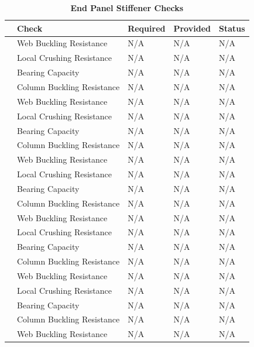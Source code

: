 \documentclass[12pt,a4paper]{report}
\numberwithin{table}{chapter}
\numberwithin{figure}{chapter}
\begin{document}
\begin{longtable}{|C{2.5cm}|L{3.5cm}|C{3.5cm}|>{\centering\arraybackslash}p{4.2cm}|C{1.8cm}|}
\caption{\textbf{End Panel Stiffener Checks}}
\hline
\textbf{} & \textbf{Check} & \textbf{Required} & \textbf{Provided} & \textbf{Status} \\[6pt]
\hline
{} & Web Buckling Resistance & N/A & N/A & N/A \\[6pt]
 & Local Crushing Resistance & N/A & N/A & N/A \\[6pt]
 & Bearing Capacity & N/A & N/A & N/A \\[6pt]
 & Column Buckling Resistance & N/A & N/A & N/A \\[6pt]
\hline
{} & Web Buckling Resistance & N/A & N/A & N/A \\[6pt]
 & Local Crushing Resistance & N/A & N/A & N/A \\[6pt]
 & Bearing Capacity & N/A & N/A & N/A \\[6pt]
 & Column Buckling Resistance & N/A & N/A & N/A \\[6pt]
\hline
{} & Web Buckling Resistance & N/A & N/A & N/A \\[6pt]
 & Local Crushing Resistance & N/A & N/A & N/A \\[6pt]
 & Bearing Capacity & N/A & N/A & N/A \\[6pt]
 & Column Buckling Resistance & N/A & N/A & N/A \\[6pt]
\hline
{} & Web Buckling Resistance & N/A & N/A & N/A \\[6pt]
 & Local Crushing Resistance & N/A & N/A & N/A \\[6pt]
 & Bearing Capacity & N/A & N/A & N/A \\[6pt]
 & Column Buckling Resistance & N/A & N/A & N/A \\[6pt]
\hline
{} & Web Buckling Resistance & N/A & N/A & N/A \\[6pt]
 & Local Crushing Resistance & N/A & N/A & N/A \\[6pt]
 & Bearing Capacity & N/A & N/A & N/A \\[6pt]
 & Column Buckling Resistance & N/A & N/A & N/A \\[6pt]
\hline
{} & Web Buckling Resistance & N/A & N/A & N/A \\[6pt]

\end{longtable}
\end{document}
